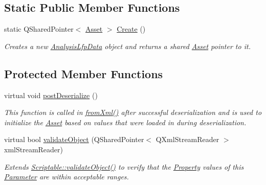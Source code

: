 \subsection*{Static Public Member Functions}
\begin{DoxyCompactItemize}
\item 
\hypertarget{class_picto_1_1_analysis_lfp_data_aab77ef333d154989cbffb839f95176dc}{static Q\-Shared\-Pointer$<$ \hyperlink{class_picto_1_1_asset}{Asset} $>$ \hyperlink{class_picto_1_1_analysis_lfp_data_aab77ef333d154989cbffb839f95176dc}{Create} ()}\label{class_picto_1_1_analysis_lfp_data_aab77ef333d154989cbffb839f95176dc}

\begin{DoxyCompactList}\small\item\em Creates a new \hyperlink{class_picto_1_1_analysis_lfp_data}{Analysis\-Lfp\-Data} object and returns a shared \hyperlink{class_picto_1_1_asset}{Asset} pointer to it. \end{DoxyCompactList}\end{DoxyCompactItemize}
\subsection*{Protected Member Functions}
\begin{DoxyCompactItemize}
\item 
virtual void \hyperlink{class_picto_1_1_analysis_lfp_data_a2ecc0790a74132a1433a6491b55eafc3}{post\-Deserialize} ()
\begin{DoxyCompactList}\small\item\em This function is called in \hyperlink{class_picto_1_1_asset_a8bed4da09ecb1c07ce0dab313a9aba67}{from\-Xml()} after successful deserialization and is used to initialize the \hyperlink{class_picto_1_1_asset}{Asset} based on values that were loaded in during deserialization. \end{DoxyCompactList}\item 
virtual bool \hyperlink{class_picto_1_1_analysis_lfp_data_ae53fa1010780d301a104e613f93dda1a}{validate\-Object} (Q\-Shared\-Pointer$<$ Q\-Xml\-Stream\-Reader $>$ xml\-Stream\-Reader)
\begin{DoxyCompactList}\small\item\em Extends \hyperlink{class_picto_1_1_scriptable_ab6e2944c43a3b5d418bf7b251594386d}{Scriptable\-::validate\-Object()} to verify that the \hyperlink{class_picto_1_1_property}{Property} values of this \hyperlink{class_picto_1_1_parameter}{Parameter} are within acceptable ranges. \end{DoxyCompactList}\end{DoxyCompactItemize}
